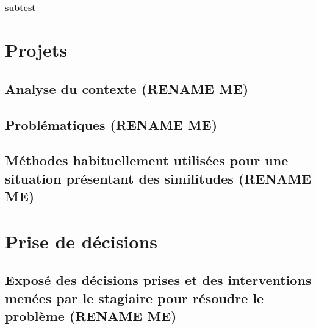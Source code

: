 \documentclass[12pt,a4paper,article]{memoir} %
\begin{document}
\paragraph{} \lipsum

\subsubsection{subtest}

\paragraph{} \lipsum

\newpage
\chapter{Projets}

\section{Analyse du contexte (RENAME ME) }

\paragraph{} \lipsum

\section{Problématiques (RENAME ME) }

\paragraph{} \lipsum

\section{Méthodes habituellement utilisées pour une situation présentant des similitudes (RENAME ME) }

\paragraph{} \lipsum

\newpage
\chapter{Prise de décisions}

\section{Exposé des décisions prises et des interventions menées par le stagiaire pour résoudre le problème (RENAME ME) }
\end{document}

